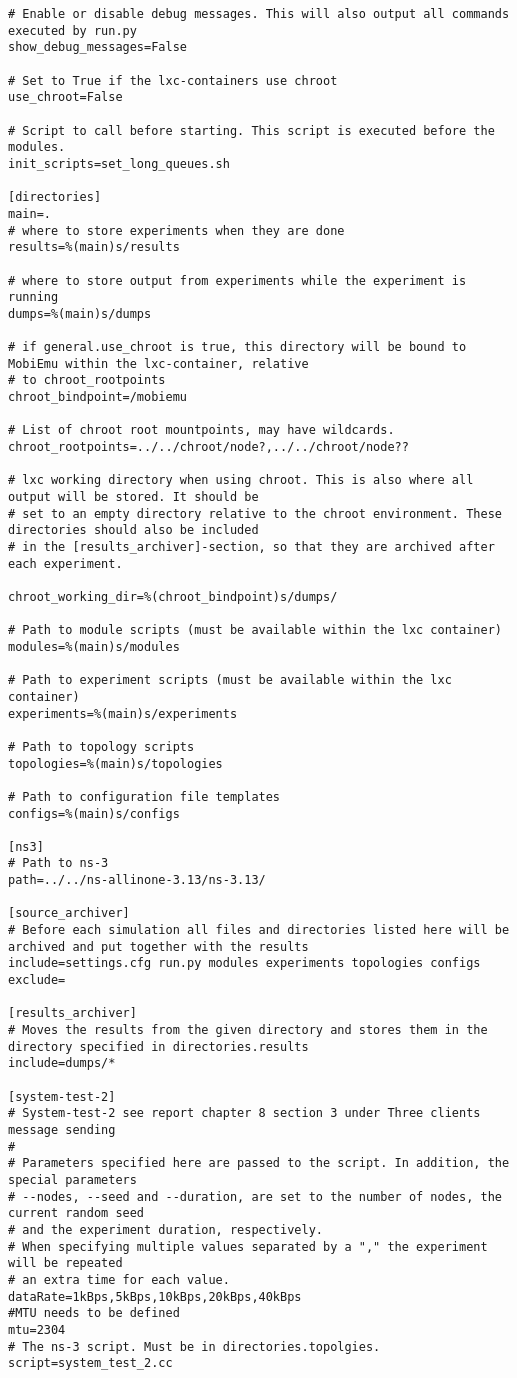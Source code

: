 \begin{lstlisting}[frame=single, caption={Setting.cfg}, label=mobiemu:setting.cfg, breaklines=true]
# Enable or disable debug messages. This will also output all commands executed by run.py
show_debug_messages=False

# Set to True if the lxc-containers use chroot
use_chroot=False

# Script to call before starting. This script is executed before the modules.
init_scripts=set_long_queues.sh

[directories]
main=.
# where to store experiments when they are done
results=%(main)s/results

# where to store output from experiments while the experiment is running
dumps=%(main)s/dumps

# if general.use_chroot is true, this directory will be bound to MobiEmu within the lxc-container, relative
# to chroot_rootpoints
chroot_bindpoint=/mobiemu

# List of chroot root mountpoints, may have wildcards.
chroot_rootpoints=../../chroot/node?,../../chroot/node??

# lxc working directory when using chroot. This is also where all output will be stored. It should be
# set to an empty directory relative to the chroot environment. These directories should also be included
# in the [results_archiver]-section, so that they are archived after each experiment.

chroot_working_dir=%(chroot_bindpoint)s/dumps/

# Path to module scripts (must be available within the lxc container)
modules=%(main)s/modules

# Path to experiment scripts (must be available within the lxc container)
experiments=%(main)s/experiments

# Path to topology scripts
topologies=%(main)s/topologies

# Path to configuration file templates
configs=%(main)s/configs

[ns3]
# Path to ns-3
path=../../ns-allinone-3.13/ns-3.13/

[source_archiver]
# Before each simulation all files and directories listed here will be archived and put together with the results
include=settings.cfg run.py modules experiments topologies configs
exclude=

[results_archiver]
# Moves the results from the given directory and stores them in the directory specified in directories.results
include=dumps/*

[system-test-2]
# System-test-2 see report chapter 8 section 3 under Three clients message sending
#
# Parameters specified here are passed to the script. In addition, the special parameters
# --nodes, --seed and --duration, are set to the number of nodes, the current random seed
# and the experiment duration, respectively.
# When specifying multiple values separated by a "," the experiment will be repeated
# an extra time for each value.
dataRate=1kBps,5kBps,10kBps,20kBps,40kBps
#MTU needs to be defined
mtu=2304
# The ns-3 script. Must be in directories.topolgies.
script=system_test_2.cc


\end{lstlisting}
